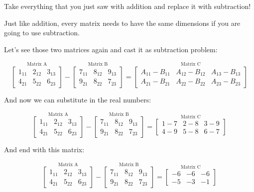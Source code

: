 \documentclass[
  letterpaper,
]{krantz}
\begin{document}
Take everything that you just saw with addition and replace it with
subtraction!

Just like addition, every matrix needs to have the same dimensions if
you are going to use subtraction.

Let's see those two matrices again and cast it as subtraction problem:

\[
\stackrel{\mbox{Matrix A}}{
\begin{bmatrix}
1_{11} & 2_{12} & 3_{13}\\
4_{21} & 5_{22} & 6_{23}
\end{bmatrix}
}
-
\stackrel{\mbox{Matrix B}}{
\begin{bmatrix}
7_{11} & 8_{12} & 9_{13}\\
9_{21} & 8_{22} & 7_{23}
\end{bmatrix} 
}
=
\stackrel{\mbox{Matrix C}}{
\begin{bmatrix}
A_{11} - B_{11}& A_{12} - B_{12} & A_{13} - B_{13}\\
A_{21} - B_{21}& A_{22} - B_{22} & A_{23} - B_{23}
\end{bmatrix}
}
\]

And now we can substitute in the real numbers:

\[
\stackrel{\mbox{Matrix A}}{
\begin{bmatrix}
1_{11} & 2_{12} & 3_{13}\\
4_{21} & 5_{22} & 6_{23}
\end{bmatrix}
}
-
\stackrel{\mbox{Matrix B}}{
\begin{bmatrix}
7_{11} & 8_{12} & 9_{13}\\
9_{21} & 8_{22} & 7_{23}
\end{bmatrix} 
}
=
\stackrel{\mbox{Matrix C}}{
\begin{bmatrix}
1 - 7 & 2 - 8 & 3 - 9\\
4 - 9 & 5 - 8 & 6 - 7
\end{bmatrix}
}
\]

And end with this matrix:

\[
\stackrel{\mbox{Matrix A}}{
\begin{bmatrix}
1_{11} & 2_{12} & 3_{13}\\
4_{21} & 5_{22} & 6_{23}
\end{bmatrix}
}
-
\stackrel{\mbox{Matrix B}}{
\begin{bmatrix}
7_{11} & 8_{12} & 9_{13}\\
9_{21} & 8_{22} & 7_{23}
\end{bmatrix} 
}
=
\stackrel{\mbox{Matrix C}}{
\begin{bmatrix}
-6 & -6 & -6 \\
-5 & -3 & -1
\end{bmatrix}
}
\]
\end{document}
